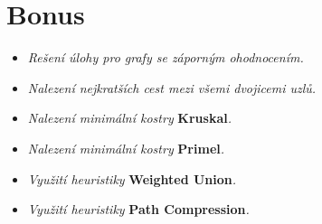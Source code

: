 \section{Bonus}

\begin{itemize}
    \item \textit{Rešení úlohy pro grafy se záporným ohodnocením.}
    \item \textit{Nalezení nejkratších cest mezi všemi dvojicemi uzlů.}
    \item \textit{Nalezení minimální kostry} \textbf{Kruskal}\textit{.}
    \item \textit{Nalezení minimální kostry } \textbf{Primel}\textit{.}
    \item \textit{Využití heuristiky } \textbf{Weighted Union}\textit{.}
    \item \textit{Využití heuristiky} \textbf{Path Compression}\textit{.}
\end{itemize}